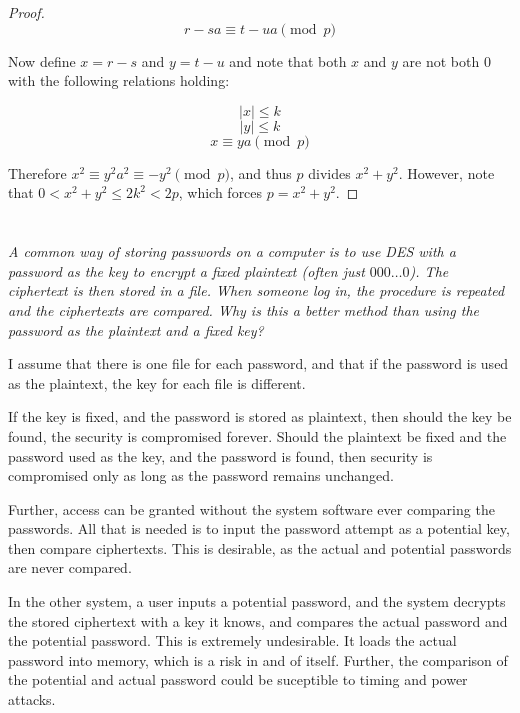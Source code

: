 \documentclass[12pt]{article}
\begin{document}
\begin{description}
\begin{proof}
            $$r - sa \equiv t - ua \pmod{p}$$

            Now define $x = r - s$ and $y = t - u$ and note that both $x$ and $y$ are not both $0$ with the following relations holding:

            $$\vert x \vert \leq k$$
            $$\vert y \vert \leq k$$
            $$x \equiv ya \pmod{p}$$

            Therefore $x^2 \equiv y^2 a^2 \equiv -y^2 \pmod{p}$, and thus $p$ divides $x^2 + y^2$. However, note that $0 < x^2 + y^2 \leq 2k^2 < 2p$, which forces $p = x^2 + y^2$.
        \end{proof}
    \end{description}

\newpage

\section{} \textit{A common way of storing passwords on a computer is to use DES with a password as the key to encrypt a fixed plaintext (often just $000\dots0$). The ciphertext is then stored in a file. When someone log in, the procedure is repeated and the ciphertexts are compared. Why is this a better method than using the password as the plaintext and a fixed key?}

    I assume that there is one file for each password, and that if the password is used as the plaintext, the key for each file is different.

    If the key is fixed, and the password is stored as plaintext, then should the key be found, the security is compromised forever. Should the plaintext be fixed and the password used as the key, and the password is found, then security is compromised only as long as the password remains unchanged.

    Further, access can be granted without the system software ever comparing the passwords. All that is needed is to input the password attempt as a potential key, then compare ciphertexts. This is desirable, as the actual and potential passwords are never compared.

    In the other system, a user inputs a potential password, and the system decrypts the stored ciphertext with a key it knows, and compares the actual password and the potential password. This is extremely undesirable. It loads the actual password into memory, which is a risk in and of itself. Further, the comparison of the potential and actual password could be suceptible to timing and power attacks.
\end{document}
